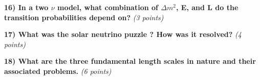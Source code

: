 {\textbf{16) In a two $\nu$ model, what combination of $\Delta m^2$, E, and L do the transition probabilities depend on?  } \hfill \textit{(3 points)}\\
\vspace*{1.5in}

\textbf{17) What was the solar neutrino puzzle ? How was it resolved?  } \hfill \textit{(4 points)}\\
\vspace{1.5in}


\textbf{18) What are the three fundamental length scales in nature and their associated problems.  } \hfill \textit{(6 points)}\\
\vspace{1.0in}


} %

